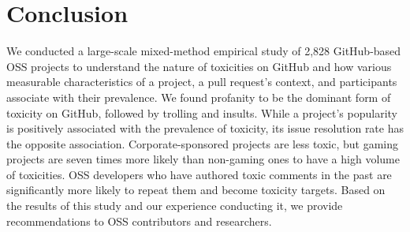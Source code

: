 \section{Conclusion}


\label{sec:conclusion}
We conducted a large-scale mixed-method empirical study of 2,828 GitHub-based OSS projects to understand 
the nature of toxicities on GitHub and how various measurable characteristics of a project, a pull request's context, and participants associate with their prevalence.
We found profanity to be the dominant form of toxicity on GitHub, followed by trolling and insults. 
While a project's popularity is positively associated with the prevalence of toxicity, its issue resolution rate has the opposite association.
Corporate-sponsored projects are less toxic, but gaming projects are seven times more likely than non-gaming ones to have a high volume of toxicities. OSS developers who have authored toxic comments in the past are significantly more likely to repeat them and become toxicity targets.
Based on the results of this study and our experience conducting it, we provide recommendations to OSS contributors and researchers.


 

